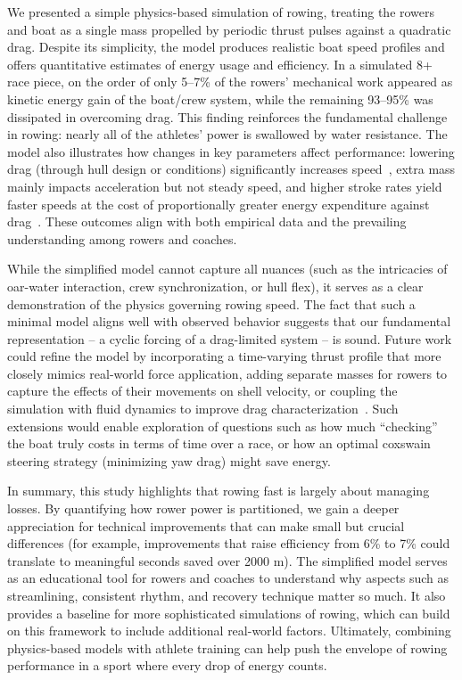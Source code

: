 \documentclass[12pt]{article}
\begin{document}
We presented a simple physics-based simulation of rowing, treating the rowers and boat as a single mass propelled by periodic thrust pulses against a quadratic drag. Despite its simplicity, the model produces realistic boat speed profiles and offers quantitative estimates of energy usage and efficiency. In a simulated 8+ race piece, on the order of only 5–7\% of the rowers’ mechanical work appeared as kinetic energy gain of the boat/crew system, while the remaining 93–95\% was dissipated in overcoming drag. This finding reinforces the fundamental challenge in rowing: nearly all of the athletes’ power is swallowed by water resistance. The model also illustrates how changes in key parameters affect performance: lowering drag (through hull design or conditions) significantly increases speed~\cite{tucklazauskas1996}, extra mass mainly impacts acceleration but not steady speed, and higher stroke rates yield faster speeds at the cost of proportionally greater energy expenditure against drag~\cite{hofmijster2010}. These outcomes align with both empirical data and the prevailing understanding among rowers and coaches.

While the simplified model cannot capture all nuances (such as the intricacies of oar-water interaction, crew synchronization, or hull flex), it serves as a clear demonstration of the physics governing rowing speed. The fact that such a minimal model aligns well with observed behavior suggests that our fundamental representation – a cyclic forcing of a drag-limited system – is sound. Future work could refine the model by incorporating a time-varying thrust profile that more closely mimics real-world force application, adding separate masses for rowers to capture the effects of their movements on shell velocity, or coupling the simulation with fluid dynamics to improve drag characterization~\cite{mola2014, day2011}. Such extensions would enable exploration of questions such as how much “checking” the boat truly costs in terms of time over a race, or how an optimal coxswain steering strategy (minimizing yaw drag) might save energy.

In summary, this study highlights that rowing fast is largely about managing losses. By quantifying how rower power is partitioned, we gain a deeper appreciation for technical improvements that can make small but crucial differences (for example, improvements that raise efficiency from 6\% to 7\% could translate to meaningful seconds saved over 2000 m). The simplified model serves as an educational tool for rowers and coaches to understand why aspects such as streamlining, consistent rhythm, and recovery technique matter so much. It also provides a baseline for more sophisticated simulations of rowing, which can build on this framework to include additional real-world factors. Ultimately, combining physics-based models with athlete training can help push the envelope of rowing performance in a sport where every drop of energy counts.
\end{document}
